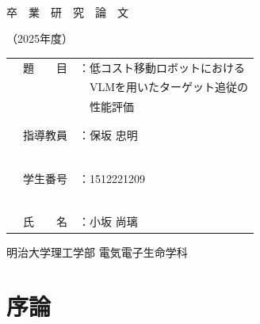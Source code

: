 \documentclass[a4paper,11pt]{ltjsreport}
\begin{document}
\begin{titlepage}
  \centering
  ~~\vspace{1cm}
 
  {\Huge 卒　業　研　究　論　文 \par}
  {\Huge （2025年度）\par}

  \vspace{8cm}

  \begin{tabular}{rl}
    {\LARGE 題　　目}　 & {\LARGE ：低コスト移動ロボットにおける} \\
                         & {\LARGE ~~VLMを用いたターゲット追従の} \\
                         & {\LARGE ~~性能評価} \\ \\ \\
    {\LARGE 指導教員}　 & {\LARGE ：保坂 忠明} \\　 \\ \\
    {\LARGE 学生番号}　 & {\LARGE ：1512221209} \\　 \\ \\
    {\LARGE 氏　　名}　 & {\LARGE ：小坂 尚璃}
  \end{tabular}

  \vfil
  \begin{flushright}
    明治大学理工学部 電気電子生命学科
  \end{flushright}
\end{titlepage}

\tableofcontents

\chapter{序論}
\label{chap:intro}
\end{document}
